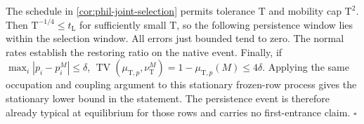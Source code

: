 The schedule in \cref{cor:phil-joint-selection} permits tolerance
\(\mathrm T\) and mobility cap \(\mathrm T^2\).
Then \(\mathrm T^{-1/4}\le t_{\mathrm L}\) for sufficiently small
\(\mathrm T\), so the following persistence window lies within the
selection window. All errors just bounded tend to zero.
The normal rates establish the restoring ratio on the native event.
Finally, if \(\max_i|p_i-p_i^M|\le\delta\),
\(\operatorname{TV}(\mu_{\mathrm T,p},\nu_{\mathrm T}^M)
 =1-\mu_{\mathrm T,p}(M)\le4\delta\).
Applying the same occupation and coupling argument to this
stationary frozen-row process gives the stationary lower bound in
the statement. The persistence event is therefore already typical
at equilibrium for those rows and carries no first-entrance claim.
\hfill\(\square\)


